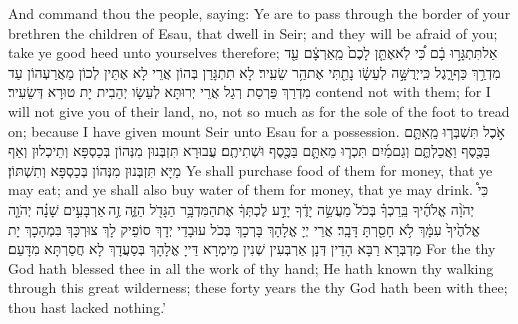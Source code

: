 {And command thou the people, saying: Ye are to pass through the border of your brethren the children of Esau, that dwell in Seir; and they will be afraid of you; take ye good heed unto yourselves therefore;}{}
{אַל\maqqaf תִּתְגָּר֣וּ בָ֔ם כִּ֠י לֹֽא\maqqaf אֶתֵּ֤ן לָכֶם֙ מֵֽאַרְצָ֔ם עַ֖ד מִדְרַ֣ךְ כַּף\maqqaf רָ֑גֶל כִּֽי\maqqaf יְרֻשָּׁ֣ה לְעֵשָׂ֔ו נָתַ֖תִּי אֶת\maqqaf הַ֥ר שֵׂעִֽיר׃}
{לָא תִתְגָּרַן בְּהוֹן אֲרֵי לָא אֶתֵּין לְכוֹן מֵאֲרַעְהוֹן עַד מִדְרַךְ פַּרְסַת רְגַל אֲרֵי יְרוּתָּא לְעֵשָׂו יְהַבִית יָת טוּרָא דְּשֵׂעִיר׃}
{contend not with them; for I will not give you of their land, no, not so much as for the sole of the foot to tread on; because I have given mount Seir unto Esau for a possession.}{}
{אֹ֣כֶל תִּשְׁבְּר֧וּ מֵֽאִתָּ֛ם בַּכֶּ֖סֶף וַאֲכַלְתֶּ֑ם וְגַם\maqqaf מַ֜יִם תִּכְר֧וּ מֵאִתָּ֛ם בַּכֶּ֖סֶף וּשְׁתִיתֶֽם׃}
{עֲבוּרָא תִּזְבְּנוּן מִנְּהוֹן בְּכַסְפָּא וְתֵיכְלוּן וְאַף מַיָּא תִּזְבְּנוּן מִנְּהוֹן בְּכַסְפָּא וְתִשְׁתּוֹן׃}
{Ye shall purchase food of them for money, that ye may eat; and ye shall also buy water of them for money, that ye may drink.}{}
{כִּי֩ יְהֹוָ֨ה אֱלֹהֶ֜יךָ בֵּֽרַכְךָ֗ בְּכֹל֙ מַעֲשֵׂ֣ה יָדֶ֔ךָ יָדַ֣ע לֶכְתְּךָ֔ אֶת\maqqaf הַמִּדְבָּ֥ר הַגָּדֹ֖ל הַזֶּ֑ה זֶ֣ה \legarmeh  אַרְבָּעִ֣ים שָׁנָ֗ה יְהֹוָ֤ה אֱלֹהֶ֙יךָ֙ עִמָּ֔ךְ לֹ֥א חָסַ֖רְתָּ דָּבָֽר׃}
{אֲרֵי יְיָ אֱלָהָךְ בָּרְכָךְ בְּכֹל עוּבָדֵי יְדָךְ סוֹפֵיק לָךְ צוּרְכָּךְ בִּמְהָכָךְ יָת מַדְבְּרָא רַבָּא הָדֵין דְּנָן אַרְבְּעִין שְׁנִין מֵימְרָא דַּייָ אֱלָהָךְ בְּסַעֲדָךְ לָא חֲסַרְתָּא מִדָּעַם׃}
{For the \lord\space thy God hath blessed thee in all the work of thy hand; He hath known thy walking through this great wilderness; these forty years the \lord\space thy God hath been with thee; thou hast lacked nothing.’}{}
